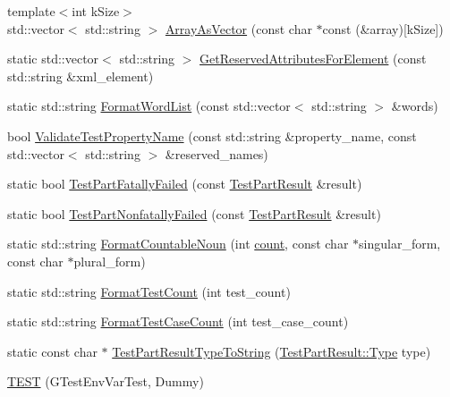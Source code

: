 \begin{DoxyCompactItemize}
\item 
{\footnotesize template$<$int k\+Size$>$ }\\std\+::vector$<$ std\+::string $>$ \hyperlink{namespacetesting_a956d4c522454fa6dfd75b5bbbefe8f9e}{Array\+As\+Vector} (const char $\ast$const (\&array)\mbox{[}k\+Size\mbox{]})
\item 
static std\+::vector$<$ std\+::string $>$ \hyperlink{namespacetesting_acb3fdfadf475a3c2f5e22a3dae73532a}{Get\+Reserved\+Attributes\+For\+Element} (const std\+::string \&xml\+\_\+element)
\item 
static std\+::string \hyperlink{namespacetesting_a4354761948a5cf56fdf905418a0f78f1}{Format\+Word\+List} (const std\+::vector$<$ std\+::string $>$ \&words)
\item 
bool \hyperlink{namespacetesting_a4c9bd414747bf0563bfdb32a2307dcdf}{Validate\+Test\+Property\+Name} (const std\+::string \&property\+\_\+name, const std\+::vector$<$ std\+::string $>$ \&reserved\+\_\+names)
\item 
static bool \hyperlink{namespacetesting_a9f19442d566c7eaec0702b9fcf282b63}{Test\+Part\+Fatally\+Failed} (const \hyperlink{classtesting_1_1TestPartResult}{Test\+Part\+Result} \&result)
\item 
static bool \hyperlink{namespacetesting_af256d104ca665115eb291f762bb659e3}{Test\+Part\+Nonfatally\+Failed} (const \hyperlink{classtesting_1_1TestPartResult}{Test\+Part\+Result} \&result)
\item 
static std\+::string \hyperlink{namespacetesting_a33e070c3e994cb75f9017fa2a044d536}{Format\+Countable\+Noun} (int \hyperlink{gmock__stress__test_8cc_afd9db40e3361ae09188795e8cbe19752}{count}, const char $\ast$singular\+\_\+form, const char $\ast$plural\+\_\+form)
\item 
static std\+::string \hyperlink{namespacetesting_a7420a0eb48a02ba210e265afb75febdf}{Format\+Test\+Count} (int test\+\_\+count)
\item 
static std\+::string \hyperlink{namespacetesting_ab8cabb45f3d8c52d336372c1b62d75c5}{Format\+Test\+Case\+Count} (int test\+\_\+case\+\_\+count)
\item 
static const char $\ast$ \hyperlink{namespacetesting_a4e9fdeef31f7e49afccfde0532f76864}{Test\+Part\+Result\+Type\+To\+String} (\hyperlink{classtesting_1_1TestPartResult_a65ae656b33fdfdfffaf34858778a52d5}{Test\+Part\+Result\+::\+Type} type)
\item 
\hyperlink{namespacetesting_af4187d1b48a2812f1335721ed8f30a99}{T\+E\+ST} (G\+Test\+Env\+Var\+Test, Dummy)
\item 

\end{DoxyCompactItemize}
